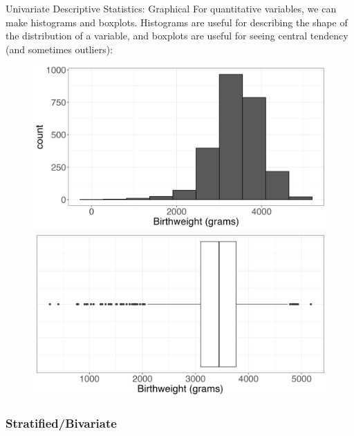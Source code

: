 \documentclass[10pt,t]{beamer}
\begin{document}
\begin{frame}{Univariate Descriptive Statistics: Graphical}
For quantitative variables, we can make histograms and boxplots. Histograms are useful for describing the shape of the distribution of a variable, and boxplots are useful for seeing central tendency (and sometimes outliers):

\vspace{0.4cm}

\begin{figure}
	\centering
	\includegraphics[scale=0.2]{fs_hist.png}
	\hspace{0.2cm}
	\includegraphics[scale=0.2]{fs_box.png}
\end{figure}

\end{frame}

\subsubsection{Stratified/Bivariate}
\end{document}
